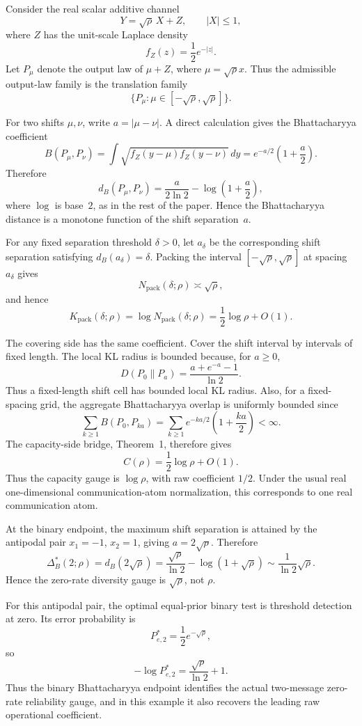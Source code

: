 \documentclass[lettersize,onecolumn]{IEEEtran}
\newcommand{\snr}{\rho}
\begin{document}
Consider the real scalar additive channel
\[
Y=\sqrt{\snr}\,X+Z,\qquad |X|\le 1,
\]
where $Z$ has the unit-scale Laplace density
\[
f_Z(z)=\frac12 e^{-|z|}.
\]
Let $P_\mu$ denote the output law of $\mu+Z$, where $\mu=\sqrt{\snr}x$. Thus the admissible output-law family is the translation family
\[
\{P_\mu:\mu\in[-\sqrt{\snr},\sqrt{\snr}]\}.
\]

For two shifts $\mu,\nu$, write $a=|\mu-\nu|$. A direct calculation gives the Bhattacharyya coefficient
\[
B(P_\mu,P_\nu)
=
\int \sqrt{f_Z(y-\mu)f_Z(y-\nu)}\,dy
=
e^{-a/2}\left(1+\frac{a}{2}\right).
\]
Therefore
\[
d_B(P_\mu,P_\nu)
=
\frac{a}{2\ln 2}
-
\log\left(1+\frac{a}{2}\right),
\]
where $\log$ is base~$2$, as in the rest of the paper. Hence the Bhattacharyya distance is a monotone function of the shift separation~$a$.

For any fixed separation threshold $\delta>0$, let $a_\delta$ be the corresponding shift separation satisfying $d_B(a_\delta)=\delta$. Packing the interval $[-\sqrt{\snr},\sqrt{\snr}]$ at spacing $a_\delta$ gives
\[
N_{\mathrm{pack}}(\delta;\snr)\asymp \sqrt{\snr},
\]
and hence
\[
K_{\mathrm{pack}}(\delta;\snr)
=
\log N_{\mathrm{pack}}(\delta;\snr)
=
\frac12\log\snr+O(1).
\]

The covering side has the same coefficient. Cover the shift interval by intervals of fixed length. The local KL radius is bounded because, for $a\ge 0$,
\[
D(P_0\|P_a)
=
\frac{a+e^{-a}-1}{\ln 2}.
\]
Thus a fixed-length shift cell has bounded local KL radius. Also, for a fixed-spacing grid, the aggregate Bhattacharyya overlap is uniformly bounded since
\[
\sum_{k\ge 1}
B(P_0,P_{ka})
=
\sum_{k\ge 1}
e^{-ka/2}\left(1+\frac{ka}{2}\right)
<\infty.
\]
The capacity-side bridge, Theorem~1, therefore gives
\[
C(\snr)=\frac12\log\snr+O(1).
\]
Thus the capacity gauge is $\log\snr$, with raw coefficient $1/2$. Under the usual real one-dimensional communication-atom normalization, this corresponds to one real communication atom.

At the binary endpoint, the maximum shift separation is attained by the antipodal pair $x_1=-1$, $x_2=1$, giving $a=2\sqrt{\snr}$. Therefore
\[
\Delta_B^*(2;\snr)
=
d_B(2\sqrt{\snr})
=
\frac{\sqrt{\snr}}{\ln 2}
-
\log(1+\sqrt{\snr})
\sim
\frac{1}{\ln 2}\sqrt{\snr}.
\]
Hence the zero-rate diversity gauge is $\sqrt{\snr}$, not $\snr$.

For this antipodal pair, the optimal equal-prior binary test is threshold detection at zero. Its error probability is
\[
P_{e,2}^*
=
\frac12 e^{-\sqrt{\snr}},
\]
so
\[
-\log P_{e,2}^*
=
\frac{\sqrt{\snr}}{\ln 2}+1.
\]
Thus the binary Bhattacharyya endpoint identifies the actual two-message zero-rate reliability gauge, and in this example it also recovers the leading raw operational coefficient.
\end{document}
